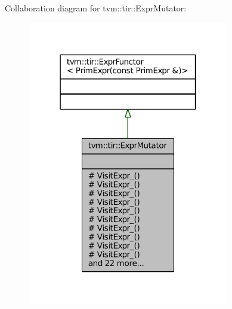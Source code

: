 Collaboration diagram for tvm\+:\+:tir\+:\+:Expr\+Mutator\+:
\nopagebreak
\begin{figure}[H]
\begin{center}
\leavevmode
\includegraphics[width=250pt]{classtvm_1_1tir_1_1ExprMutator__coll__graph}
\end{center}
\end{figure}
